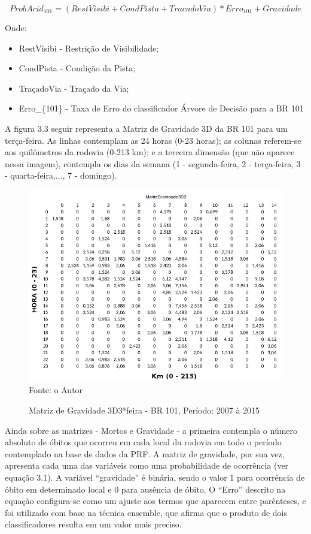 \begin{equation}
ProbAcid_{101} = (RestVisibi + CondPista + TracadoVia) *  Erro_{101} + Gravidade
\end{equation} 

Onde:

\begin{itemize}
	\item RestVisibi - Restrição de Visibilidade;
	\item CondPista  - Condição da Pista;
	\item TraçadoVia - Traçado da Via;
	\item Erro\_\{101\} - Taxa de Erro do classificador Árvore de Decisão para a BR 101
\end{itemize}
 
 \pagebreak
 
 A figura 3.3 seguir representa a Matriz de Gravidade 3D da BR 101 para um terça-feira. As linhas contemplam as 24 horas (0-23 horas); as colunas referem-se aos quilômetros da rodovia (0-213 km); e a terceira dimensão (que não aparece nessa imagem),  contempla os dias da semana (1 - segunda-feira, 2 - terça-feira, 3 - quarta-feira,..., 7 - domingo). 
 
 
 \begin{figure}[!ht]
 	\centering
 	\caption{Matriz de Gravidade 3D3ªfeira - BR 101, Período: 2007 à 2015}
 	\label{fig:MatrizGravidade3D2}
 	\includegraphics[width=0.7\linewidth]{Figuras/Metodologia/MatrizGravidade3D2.png}\\
 	\tiny Fonte: o Autor
 \end{figure}



Ainda sobre as matrizes - Mortos e Gravidade - a primeira contempla o número absoluto de óbitos que ocorreu em cada local da rodovia em todo o período contemplado na base de dados da PRF. A matriz de gravidade, por sua vez, apresenta cada uma das variáveis como uma probabilidade de ocorrência (ver equação 3.1). A variável ``gravidade'' é binária, sendo o valor 1 para ocorrência de óbito em determinado local e 0 para ausência de óbito. O ``Erro'' descrito na equação configura-se como um ajuste aos termos que aparecem entre parênteses, e foi utilizado com base na técnica ensemble, que afirma que o produto de dois classificadores resulta em um valor mais preciso.    

